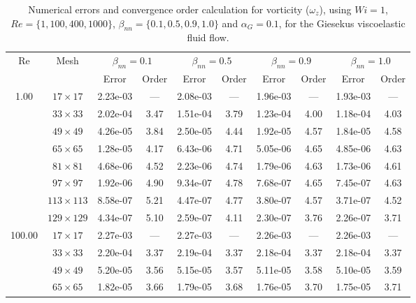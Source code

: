 \documentclass[preprint, 12pt]{elsarticle}
\begin{document}
\begin{center}
\begin{table}[H]
\caption{Numerical errors and convergence order calculation for vorticity ($\omega_{z}$), using \mbox{$Wi=1$}, $Re=\{1,100,400,1000\}$, $\beta_{nn}=\{0.1,0.5,0.9,1.0\}$ and $\alpha_G = 0.1$, for the Giesekus viscoelastic fluid flow.\label{tab_GiesekusWzalphaG01Resumida}}
\scriptsize{
    \begin{tabular*}{\textwidth}{@{\extracolsep\fill}cccccccccc@{}}
    \hline
    \multirow{2}{*}{$\operatorname{Re}$} & \multirow{2}{*}{Mesh} & \multicolumn{2}{c}{$\beta_{nn}=0.1$}  & \multicolumn{2}{c}{$\beta_{nn}=0.5$}  & \multicolumn{2}{c}{$\beta_{nn}=0.9$}  & \multicolumn{2}{c}{$\beta_{nn}=1.0$}\\ %
     & & Error & Order & Error & Order & Error & Order & Error & Order \\
    \hline
    \multirow{7}{*}{1.00} & $17\times 17$ & 2.23e-03 & --- & 2.08e-03 & --- & 1.96e-03 & --- & 1.93e-03 & --- \\
    & $33\times 33$ & 2.02e-04 & 3.47 & 1.51e-04 & 3.79 & 1.23e-04 & 4.00 & 1.18e-04 & 4.03 \\
    & $49\times 49$ & 4.26e-05 & 3.84 & 2.50e-05 & 4.44 & 1.92e-05 & 4.57 & 1.84e-05 & 4.58 \\
    & $65\times 65$ & 1.28e-05 & 4.17 & 6.43e-06 & 4.71 & 5.05e-06 & 4.65 & 4.85e-06 & 4.63 \\
    & $81\times 81$ & 4.68e-06 & 4.52 & 2.23e-06 & 4.74 & 1.79e-06 & 4.63 & 1.73e-06 & 4.61 \\
    & $97\times 97$ & 1.92e-06 & 4.90 & 9.34e-07 & 4.78 & 7.68e-07 & 4.65 & 7.45e-07 & 4.63 \\
    & $113\times 113$ & 8.58e-07 & 5.21 & 4.47e-07 & 4.77 & 3.80e-07 & 4.57 & 3.71e-07 & 4.52 \\
    & $129\times 129$ & 4.34e-07 & 5.10 & 2.59e-07 & 4.11 & 2.30e-07 & 3.76 & 2.26e-07 & 3.71 \\
    \hline\hline
    \multirow{7}{*}{100.00} & $17\times 17$ & 2.27e-03 & --- & 2.27e-03 & --- & 2.26e-03 & --- & 2.26e-03 & --- \\
    & $33\times 33$ & 2.20e-04 & 3.37 & 2.19e-04 & 3.37 & 2.18e-04 & 3.37 & 2.18e-04 & 3.37 \\
    & $49\times 49$ & 5.20e-05 & 3.56 & 5.15e-05 & 3.57 & 5.11e-05 & 3.58 & 5.10e-05 & 3.59 \\
    & $65\times 65$ & 1.82e-05 & 3.66 & 1.79e-05 & 3.68 & 1.76e-05 & 3.70 & 1.75e-05 & 3.71 \\

\end{tabular*}}
\end{table}
\end{center}
\end{document}
